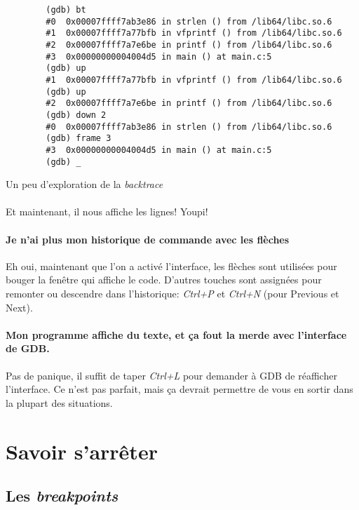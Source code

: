 \begin{listing}[H]
	\begin{verbatim}
		(gdb) bt
		#0  0x00007ffff7ab3e86 in strlen () from /lib64/libc.so.6
		#1  0x00007ffff7a77bfb in vfprintf () from /lib64/libc.so.6
		#2  0x00007ffff7a7e6be in printf () from /lib64/libc.so.6
		#3  0x00000000004004d5 in main () at main.c:5
		(gdb) up
		#1  0x00007ffff7a77bfb in vfprintf () from /lib64/libc.so.6
		(gdb) up
		#2  0x00007ffff7a7e6be in printf () from /lib64/libc.so.6
		(gdb) down 2
		#0  0x00007ffff7ab3e86 in strlen () from /lib64/libc.so.6
		(gdb) frame 3
		#3  0x00000000004004d5 in main () at main.c:5
		(gdb) _
	\end{verbatim}
	\caption{Un peu d'exploration de la \textit{backtrace}}
\end{listing}

\paragraph{} Et maintenant, il nous affiche les lignes! Youpi!

\paragraph{Je n'ai plus mon historique de commande avec les flèches \frownie}
Eh oui, maintenant que l'on a activé l'interface, les flèches sont utilisées
pour bouger la fenêtre qui affiche le code. D'autres touches sont assignées
pour remonter ou descendre dans l'historique: \textit{Ctrl+P} et
\textit{Ctrl+N} (pour Previous et Next).

\paragraph{Mon programme affiche du texte, et ça fout la merde avec l'interface
	de GDB.} Pas de panique, il suffit de taper \textit{Ctrl+L} pour demander à
GDB de réafficher l'interface. Ce n'est pas parfait, mais ça devrait permettre
de vous en sortir dans la plupart des situations.

\section{Savoir s'arrêter}

\subsection{Les \textit{breakpoints}}

